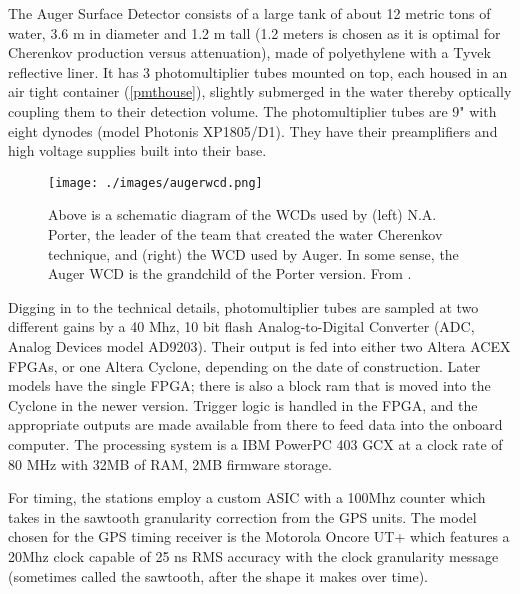 
The Auger Surface Detector consists of a large tank of about 12 metric tons of water, 3.6 m in diameter and 1.2 m tall (1.2 meters is chosen as it is optimal for Cherenkov production versus attenuation), made of polyethylene with a Tyvek reflective liner. It has 3 photomultiplier tubes mounted on top, each housed in an air tight container (\autoref{pmthouse}), slightly submerged in the water thereby optically coupling them to their detection volume. The photomultiplier tubes are 9" with eight dynodes (model Photonis XP1805/D1). They have their preamplifiers and high voltage supplies built into their base. 
\begin{figure}[h!]
\begin{center}
\texttt{[image: ./images/augerwcd.png]}
\caption[Auger Surface Station Diagram]{Above is a schematic diagram of the WCDs used by (left) N.A. Porter, the leader of the team that created the water Cherenkov technique, and (right) the WCD used by Auger. In some sense, the Auger WCD is the grandchild of the Porter version. From \textcite{ultraray}.}
\label{augerwcd}
\end{center}
\end{figure}
Digging in to the technical details, photomultiplier tubes are sampled at two different gains by a 40 Mhz, 10 bit flash Analog-to-Digital Converter (ADC, Analog Devices model AD9203). Their output is fed into either two Altera ACEX FPGAs, or one Altera Cyclone, depending on the date of construction. Later models have the single FPGA; there is also a block ram that is moved into the Cyclone in the newer version. Trigger logic is handled in the FPGA, and the appropriate outputs are made available from there to feed data into the onboard computer. The processing system is a IBM PowerPC 403 GCX at a clock rate of 80 MHz with 32MB of RAM, 2MB firmware storage.

For timing, the stations employ a custom ASIC with a 100Mhz counter which takes in the sawtooth granularity correction from the GPS units. The model chosen for the GPS timing receiver is the Motorola Oncore UT+ which features a 20Mhz clock capable of 25 ns RMS accuracy with the clock granularity message (sometimes called the sawtooth, after the shape it makes over time). 

